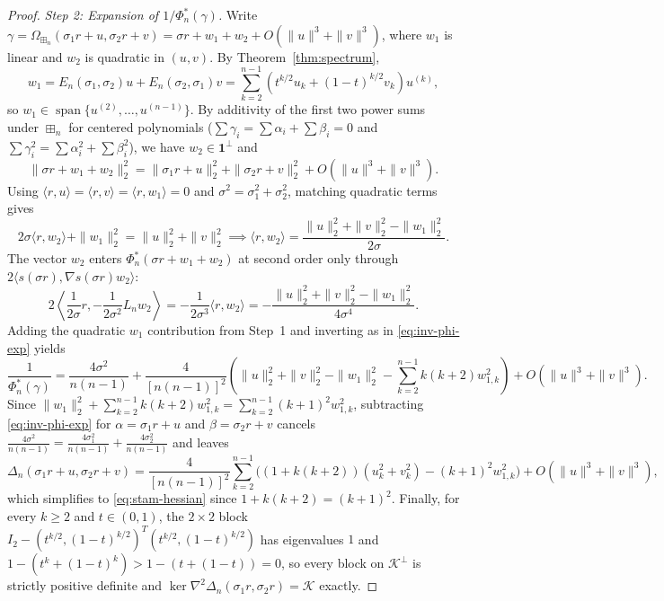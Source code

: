 \documentclass[11pt,a4paper]{article}
\theoremstyle{definition}
\DeclareMathOperator{\Span}{span}
\newcommand{\boxplusn}{\boxplus_n}
\newcommand{\one}{\mathbf{1}}
\begin{document}
\begin{proof}
\emph{Step 2: Expansion of $1/\Phi_n^*(\gamma)$.}
Write $\gamma = \Omega_{\boxplusn}(\sigma_1 r + u, \sigma_2 r + v) = \sigma r + w_1 + w_2 + O(\|u\|^3 + \|v\|^3)$, where $w_1$ is linear and $w_2$ is quadratic in $(u, v)$. By Theorem~\ref{thm:spectrum},
\[
w_1 = E_n(\sigma_1,\sigma_2) u + E_n(\sigma_2, \sigma_1) v = \sum_{k=2}^{n-1} \left(t^{k/2} u_k + (1-t)^{k/2} v_k\right) u^{(k)},
\]
so $w_1 \in \Span\{u^{(2)},\dots,u^{(n-1)}\}$. By additivity of the first two power sums under $\boxplusn$ for centered polynomials ($\sum \gamma_i = \sum \alpha_i + \sum \beta_i = 0$ and $\sum \gamma_i^2 = \sum \alpha_i^2 + \sum \beta_i^2$), we have $w_2 \in \one^\perp$ and
\[
\|\sigma r + w_1 + w_2\|_2^2 = \|\sigma_1 r + u\|_2^2 + \|\sigma_2 r + v\|_2^2 + O(\|u\|^3 + \|v\|^3).
\]
Using $\langle r, u\rangle = \langle r, v\rangle = \langle r, w_1\rangle = 0$ and $\sigma^2 = \sigma_1^2 + \sigma_2^2$, matching quadratic terms gives
\[
2\sigma\langle r, w_2\rangle + \|w_1\|_2^2 = \|u\|_2^2 + \|v\|_2^2 \implies \langle r, w_2\rangle = \frac{\|u\|_2^2 + \|v\|_2^2 - \|w_1\|_2^2}{2\sigma}.
\]
The vector $w_2$ enters $\Phi_n^*(\sigma r + w_1 + w_2)$ at second order only through $2\langle s(\sigma r), \nabla s(\sigma r) w_2\rangle$:
\[
2\left\langle \frac{1}{2\sigma} r, -\frac{1}{2\sigma^2} L_n w_2\right\rangle = -\frac{1}{2\sigma^3}\langle r, w_2\rangle = -\frac{\|u\|_2^2 + \|v\|_2^2 - \|w_1\|_2^2}{4\sigma^4}.
\]
Adding the quadratic $w_1$ contribution from Step~1 and inverting as in \eqref{eq:inv-phi-exp} yields
\[
\frac{1}{\Phi_n^*(\gamma)} = \frac{4\sigma^2}{n(n-1)} + \frac{4}{[n(n-1)]^2} \left( \|u\|_2^2 + \|v\|_2^2 - \|w_1\|_2^2 - \sum_{k=2}^{n-1} k(k+2) w_{1,k}^2 \right) + O(\|u\|^3 + \|v\|^3).
\]
Since $\|w_1\|_2^2 + \sum_{k=2}^{n-1} k(k+2)w_{1,k}^2 = \sum_{k=2}^{n-1} (k+1)^2 w_{1,k}^2$, subtracting \eqref{eq:inv-phi-exp} for $\alpha = \sigma_1 r + u$ and $\beta = \sigma_2 r + v$ cancels $\frac{4\sigma^2}{n(n-1)} = \frac{4\sigma_1^2}{n(n-1)} + \frac{4\sigma_2^2}{n(n-1)}$ and leaves
\[
\Delta_n(\sigma_1 r + u, \sigma_2 r + v) = \frac{4}{[n(n-1)]^2} \sum_{k=2}^{n-1} \Big( (1 + k(k+2))(u_k^2 + v_k^2) - (k+1)^2 w_{1,k}^2 \Big) + O(\|u\|^3 + \|v\|^3),
\]
which simplifies to \eqref{eq:stam-hessian} since $1 + k(k+2) = (k+1)^2$. Finally, for every $k \ge 2$ and $t \in (0, 1)$, the $2 \times 2$ block $I_2 - (t^{k/2}, (1-t)^{k/2})^T(t^{k/2}, (1-t)^{k/2})$ has eigenvalues $1$ and $1 - (t^k + (1-t)^k) > 1 - (t + (1-t)) = 0$, so every block on $\mathcal{K}^\perp$ is strictly positive definite and $\ker \nabla^2 \Delta_n(\sigma_1 r, \sigma_2 r) = \mathcal{K}$ exactly.
\end{proof}
\end{document}
